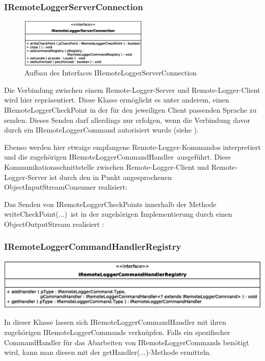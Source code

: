 \subsubsection{IRemoteLoggerServerConnection}
\begin{figure}
	\vspace{-10px} \hspace{5px}
	\includegraphics[width=230px]{../img/CD-IRemoteLoggerServerConnection.eps}
	\caption{Aufbau des Interfaces \glqq IRemoteLoggerServerConnection\grqq}
\end{figure}
\par Die Verbindung zwischen einem Remote-Logger-Server und Remote-Logger-Client wird hier repräsentiert. Diese Klasse ermöglicht es unter anderem, einen IRemoteLoggerCheckPoint in der für den jeweiligen Client passenden Sprache zu senden. Dieses Senden darf allerdings nur erfolgen, wenn die Verbindung davor durch ein IRemoteLoggerCommand autorisiert wurde (siehe ). 
\par Ebenso werden hier etwaige empfangene Remote-Logger-Kommandos interpretiert und die zugehörigen \glqq IRemoteLoggerCommandHandler\grqq\ ausgeführt. Diese Kommunikationsschnittstelle zwischen Remote-Logger-Client und Remote-Logger-Server ist durch den in Punkt  angesprochenen ObjectInputStreamConsumer realisiert:

\par Das Senden von IRemoteLoggerCheckPoints innerhalb der Methode \glqq writeCheckPoint(...)\grqq\ ist in der zugehörigen Implementierung durch einen ObjectOutputStream realisiert :


\subsubsection{IRemoteLoggerCommandHandlerRegistry}
\includegraphics[width=\textwidth]{../img/CD-IRemoteLoggerCommandHandlerRegistry.eps}
\par In dieser Klasse lassen sich IRemoteLoggerCommandHandler mit ihren zugehörigen IRemoteLoggerCommands verknüpfen. Falls ein spezifischer CommandHandler für das Abarbeiten von IRemoteLoggerCommands benötigt wird, kann man diesen mit der getHandler(...)-Methode ermitteln.

